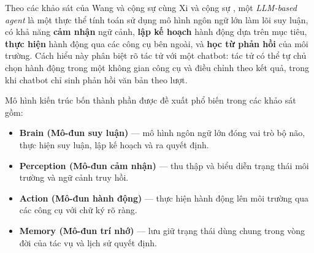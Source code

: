 Theo các khảo sát của Wang và cộng sự \cite{wang_llm_agent_survey_2024} cùng Xi và cộng sự \cite{xi_rise_agents_2023}, một \textit{LLM-based agent} là một thực thể tính toán sử dụng mô hình ngôn ngữ lớn làm lõi suy luận, có khả năng \textbf{cảm nhận} ngữ cảnh, \textbf{lập kế hoạch} hành động dựa trên mục tiêu, \textbf{thực hiện} hành động qua các công cụ bên ngoài, và \textbf{học từ phản hồi} của môi trường. Cách hiểu này phân biệt rõ tác tử với một chatbot: tác tử có thể tự chủ chọn hành động trong một không gian công cụ và điều chỉnh theo kết quả, trong khi chatbot chỉ sinh phản hồi văn bản theo lượt.

Mô hình kiến trúc bốn thành phần được đề xuất phổ biến trong các khảo sát \cite{wang_llm_agent_survey_2024,xi_rise_agents_2023} gồm:
\begin{itemize}
  \item \textbf{Brain (Mô-đun suy luận)} --- mô hình ngôn ngữ lớn đóng vai trò bộ não, thực hiện suy luận, lập kế hoạch và ra quyết định.
  \item \textbf{Perception (Mô-đun cảm nhận)} --- thu thập và biểu diễn trạng thái môi trường và ngữ cảnh truy hồi.
  \item \textbf{Action (Mô-đun hành động)} --- thực hiện hành động lên môi trường qua các công cụ với chữ ký rõ ràng.
  \item \textbf{Memory (Mô-đun trí nhớ)} --- lưu giữ trạng thái dùng chung trong vòng đời của tác vụ và lịch sử quyết định.
\end{itemize}


